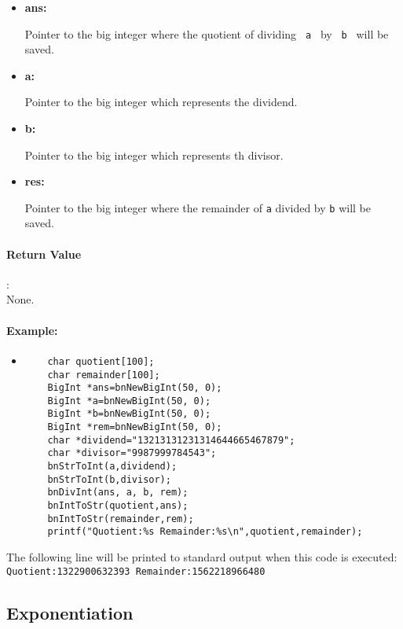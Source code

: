 \documentclass{book}
\begin{document}
\begin{itemize}
\item{\bf ans:}

Pointer to the big integer where the quotient of dividing \verb+ a + by \verb+ b + will be saved.

\item {\bf a:}

Pointer to the big integer which represents the dividend. 

\item {\bf b:}

Pointer to the big integer which represents th divisor.

\item {\bf res:}

Pointer to the big integer where the remainder of \verb+a+ divided by \verb+b+ will be saved. 

\end{itemize}

\paragraph{Return Value}:\\

None.

\paragraph{Example:}

\begin{itemize}
\item
\begin{verbatim}
    char quotient[100];
    char remainder[100];
    BigInt *ans=bnNewBigInt(50, 0);
    BigInt *a=bnNewBigInt(50, 0);
    BigInt *b=bnNewBigInt(50, 0);
    BigInt *rem=bnNewBigInt(50, 0);
    char *dividend="13213131231314644665467879";
    char *divisor="9987999784543";
    bnStrToInt(a,dividend);
    bnStrToInt(b,divisor);
    bnDivInt(ans, a, b, rem);
    bnIntToStr(quotient,ans);
    bnIntToStr(remainder,rem);
    printf("Quotient:%s Remainder:%s\n",quotient,remainder);
\end{verbatim}
\end{itemize}

The following line will be printed to standard output when this code is executed:\\

\verb+Quotient:1322900632393 Remainder:1562218966480+

\subsection{Exponentiation}
\end{document}
